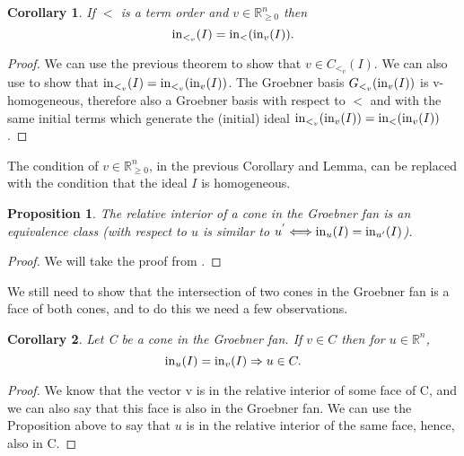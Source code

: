 \documentclass[12pt,a4paper]{report}
\newtheorem{corollary}{Corollary}
\newtheorem{proposition}{Proposition}
\begin{document}
\begin{corollary}
If $<$ is a term order and $v \in \mathbb{R}_{\geq 0} ^{n}$ then
\begin{equation*}
    \operatorname{in}_{{<}_{v}} (I) = \operatorname{in}_{<} (\operatorname{in}_{v} (I)).
\end{equation*}
\end{corollary}

\begin{proof}
We can use the previous theorem to show that $v \in C_{{<}_{v}} (I)$. We can also use \cite[Lemma 3.1.12]{AndersPHD} to show that $\operatorname{in}_{{<}_{v}} (I) = \operatorname{in}_{{<}_{v}} (\operatorname{in}_{v} (I))$. The Groebner basis $G_{{<}_{v}} (\operatorname{in}_{v}(I))$ is v-homogeneous, therefore also a Groebner basis with respect to $<$ and with the same initial terms which generate the (initial) ideal $\operatorname{in}_{{<}_{v}} (\operatorname{in}_{v} (I)) = \operatorname{in}_{<} (\operatorname{in}_{v} (I))$.
\end{proof}

The condition of $v \in \mathbb{R}_{\geq 0}^{n}$, in the previous Corollary and Lemma, can be replaced with the condition that the ideal $I$ is homogeneous.

\begin{proposition}
The relative interior of a cone in the Groebner fan is an equivalence class (with respect to $u$ is similar to $u^{'} \Longleftrightarrow \operatorname{in}_{u} (I) = \operatorname{in}_{u'} (I)$).
\end{proposition}

\begin{proof}
We will take the proof from \cite[Proposition 3.1.16]{AndersPHD}.
\end{proof}

We still need to show that the intersection of two cones in the Groebner fan is a face of both cones, and to do this we need a few observations.

\begin{corollary}
Let C be a cone in the Groebner fan. If $v \in C$ then for $u \in \mathbb{R}^{n}$,
\begin{equation*}
    \operatorname{in}_{u} (I) = \operatorname{in}_{v} (I) \Rightarrow u \in C.
\end{equation*}
\end{corollary}

\begin{proof}
We know that the vector v is in the relative interior of some face of C, and we can also say that this face is also in the Groebner fan. We can use the Proposition above to say that $u$ is in the relative interior of the same face, hence, also in C.
\end{proof}
\end{document}

